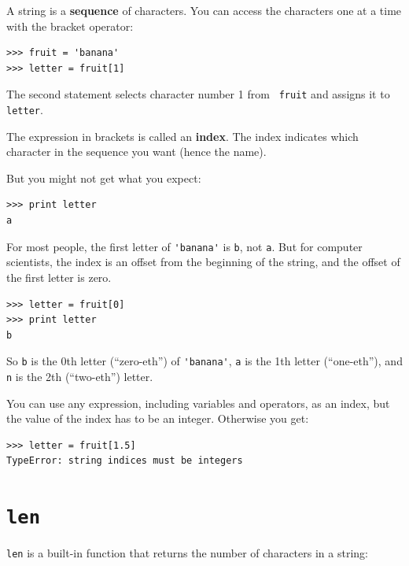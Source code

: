 \documentclass[10pt]{book}
\begin{document}
A string is a {\bf sequence} of characters.  
You can access the characters one at a time with the
bracket operator:

\beforeverb
\begin{verbatim}
>>> fruit = 'banana'
>>> letter = fruit[1]
\end{verbatim}
\afterverb
%
The second statement selects character number 1 from {\tt
fruit} and assigns it to {\tt letter}.  


The expression in brackets is called an {\bf index}.  
The index indicates which character in the sequence you
want (hence the name).

But you might not get what you expect:

\beforeverb
\begin{verbatim}
>>> print letter
a
\end{verbatim}
\afterverb
%
For most people, the first letter of \verb"'banana'" is {\tt b}, not
{\tt a}.  But for computer scientists, the index is an offset from the
beginning of the string, and the offset of the first letter is zero.

\beforeverb
\begin{verbatim}
>>> letter = fruit[0]
>>> print letter
b
\end{verbatim}
\afterverb
%
So {\tt b} is the 0th letter (``zero-eth'') of \verb"'banana'", {\tt a}
is the 1th letter (``one-eth''), and {\tt n} is the 2th (``two-eth'')
letter.


You can use any expression, including variables and operators, as an
index, but the value of the index has to be an integer.  Otherwise you
get:


\beforeverb
\begin{verbatim}
>>> letter = fruit[1.5]
TypeError: string indices must be integers
\end{verbatim}
\afterverb
%

\section{{\tt len}}


{\tt len} is a built-in function that returns the number of characters
in a string:
\end{document}
